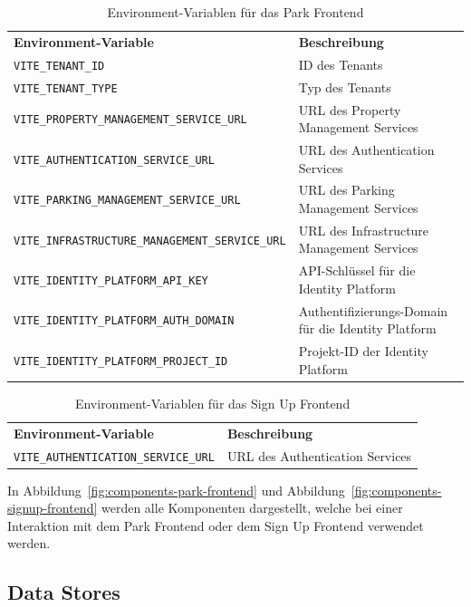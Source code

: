 {
\begin{longtable}{l p{6cm}}
  \caption{Environment-Variablen für das Park Frontend}
  \label{tab:park-frontend-env-vars} \\
  \textbf{Environment-Variable} & \textbf{Beschreibung} \\ [1ex]
  \texttt{VITE\_TENANT\_ID} & ID des Tenants \\ [0.5ex]
  \texttt{VITE\_TENANT\_TYPE} & Typ des Tenants \\ [0.5ex]
  \texttt{VITE\_PROPERTY\_MANAGEMENT\_SERVICE\_URL} & URL des Property Management Services \\ [0.5ex]
  \texttt{VITE\_AUTHENTICATION\_SERVICE\_URL} & URL des Authentication Services \\ [0.5ex]
  \texttt{VITE\_PARKING\_MANAGEMENT\_SERVICE\_URL} & URL des Parking Management Services \\ [0.5ex]
  \texttt{VITE\_INFRASTRUCTURE\_MANAGEMENT\_SERVICE\_URL} & URL des Infrastructure Management Services \\ [0.5ex]
  \texttt{VITE\_IDENTITY\_PLATFORM\_API\_KEY} & API-Schlüssel für die Identity Platform \\ [0.5ex]
  \texttt{VITE\_IDENTITY\_PLATFORM\_AUTH\_DOMAIN} & Authentifizierungs-Domain für die Identity Platform \\ [0.5ex]
  \texttt{VITE\_IDENTITY\_PLATFORM\_PROJECT\_ID} & Projekt-ID der Identity Platform \\ 
\end{longtable}}

{
\begin{longtable}{l p{6cm}}
  \caption{Environment-Variablen für das Sign Up Frontend}
  \label{tab:signup-frontend-env-vars} \\
  \textbf{Environment-Variable} & \textbf{Beschreibung} \\ [1ex]
  \texttt{VITE\_AUTHENTICATION\_SERVICE\_URL} & URL des Authentication Services \\ 
\end{longtable}}

In Abbildung~\ref{fig:components-park-frontend} und Abbildung~\ref{fig:components-signup-frontend} werden alle Komponenten dargestellt, welche bei einer Interaktion mit dem Park Frontend oder dem Sign Up Frontend verwendet werden.
\subsection{Data Stores}